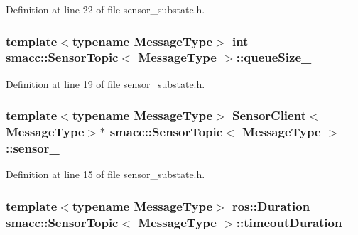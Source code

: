 Definition at line 22 of file sensor\+\_\+substate.\+h.

\subsubsection[{\texorpdfstring{queue\+Size\+\_\+}{queueSize_}}]{\setlength{\rightskip}{0pt plus 5cm}template$<$typename Message\+Type$>$ {\bf int} {\bf smacc\+::\+Sensor\+Topic}$<$ Message\+Type $>$\+::queue\+Size\+\_\+}\hypertarget{classsmacc_1_1SensorTopic_a8f9f1d8ca6c9c6430e1ee1ba78022483}{}\label{classsmacc_1_1SensorTopic_a8f9f1d8ca6c9c6430e1ee1ba78022483}


Definition at line 19 of file sensor\+\_\+substate.\+h.

\subsubsection[{\texorpdfstring{sensor\+\_\+}{sensor_}}]{\setlength{\rightskip}{0pt plus 5cm}template$<$typename Message\+Type$>$ {\bf Sensor\+Client}$<$Message\+Type$>$$\ast$ {\bf smacc\+::\+Sensor\+Topic}$<$ Message\+Type $>$\+::sensor\+\_\+}\hypertarget{classsmacc_1_1SensorTopic_a0f51a83e96f6b735033a8474ef1c4191}{}\label{classsmacc_1_1SensorTopic_a0f51a83e96f6b735033a8474ef1c4191}


Definition at line 15 of file sensor\+\_\+substate.\+h.

\subsubsection[{\texorpdfstring{timeout\+Duration\+\_\+}{timeoutDuration_}}]{\setlength{\rightskip}{0pt plus 5cm}template$<$typename Message\+Type$>$ ros\+::\+Duration {\bf smacc\+::\+Sensor\+Topic}$<$ Message\+Type $>$\+::timeout\+Duration\+\_\+}\hypertarget{classsmacc_1_1SensorTopic_a026137c1c2cf7212c9b845e7c33c9b3e}{}\label{classsmacc_1_1SensorTopic_a026137c1c2cf7212c9b845e7c33c9b3e}


